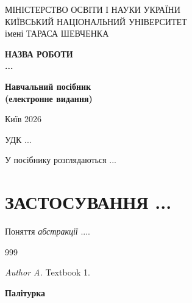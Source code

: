 \documentclass[12pt,openany]{book}
\begin{document}

\thispagestyle{empty}
\begin{center}
    МІНІСТЕРСТВО ОСВІТИ І НАУКИ УКРАЇНИ\\[0.7cm]
    КИЇВСЬКИЙ НАЦІОНАЛЬНИЙ УНІВЕРСИТЕТ\\
    імені ТАРАСА ШЕВЧЕНКА
\end{center}

\vspace{5cm}
\begin{center}
{\large{\bf НАЗВА РОБОТИ\\ ...}}
\end{center}
\vspace{3cm}
\begin{center}
     {\bf Навчальний посібник\\
           (електронне видання)}
\end{center}

\vspace*{\fill}\centerline{Київ 2026}
\vspace{1cm}

\newpage
\thispagestyle{empty}
{\footnotesize
\hspace{-0.70cm}УДК ...

\vspace{0.3cm}

У посібнику розглядаються ...

}

\newpage
\thispagestyle{empty}
\tableofcontents


\newpage

\chapter{ЗАСТОСУВАННЯ ...}

\lipsum[2]

Поняття {\em абстракції} ....

\lipsum[11-21]

\begin{thebibliography}{999}
\thispagestyle{empty}
{\scriptsize
{} {\em Author A.}
\newblock Textbook 1.
}
\end{thebibliography}


{\scriptsize
\printindex
}


\newpage
\thispagestyle{empty}
\vspace{2cm}
\vspace*{\fill}

{\footnotesize
\begin{center}
                      {\Huge\bfseries Палітурка}
\end{center}

\vspace{1cm}

}
\vspace*{\fill}
\end{document}

